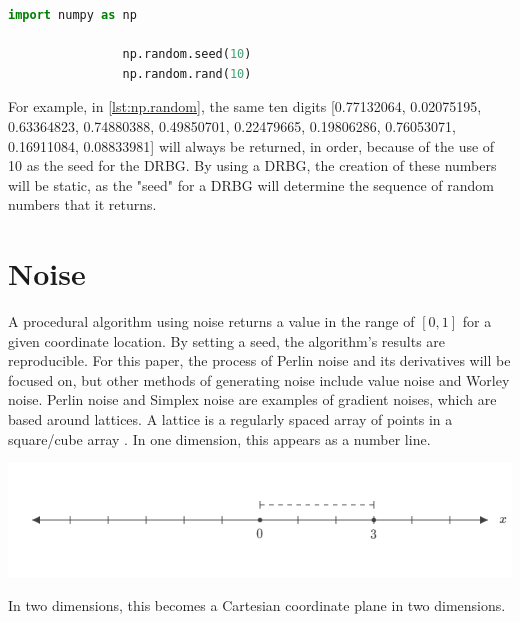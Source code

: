 \documentclass[10pt]{report}
\begin{document}
			\begin{lstlisting}[label={lst:np.random}, language=Python, frame=none, caption={An example of seeding NumPy's random function in Python}, captionpos=b]
				import numpy as np
				
				np.random.seed(10)
				np.random.rand(10)
			\end{lstlisting}
			
			For example, in \autoref{lst:np.random}, the same ten digits [0.77132064, 0.02075195, 0.63364823, 0.74880388, 0.49850701, 0.22479665, 0.19806286, 0.76053071, 0.16911084, 0.08833981] will always be returned, in order, because of the use of 10 as the seed for the DRBG. By using a DRBG, the creation of these numbers will be static, as the "seed" for a DRBG will determine the sequence of random numbers that it returns.
			
	\vspace{10pt}
	\let\clearpage\relax
	\chapter{Noise}
		
		A procedural algorithm using noise returns a value in the range of \([0,1]\) for a given coordinate location. By setting a seed, the algorithm's results are reproducible. For this paper, the process of Perlin noise and its derivatives will be focused on, but other methods of generating noise include value noise and Worley noise. Perlin noise and Simplex noise are examples of gradient noises, which are based around lattices. A lattice is a regularly spaced array of points in a square/cube array \cite{integer-lattice}. In one dimension, this appears as a number line. 
		
		\begin{minipage}{\textwidth}
			\centering
			\includegraphics[scale=.4]{1d}
			\label{fig:1d}
		\end{minipage}
	
		In two dimensions, this becomes a Cartesian coordinate plane in two dimensions.
	
\end{document}
